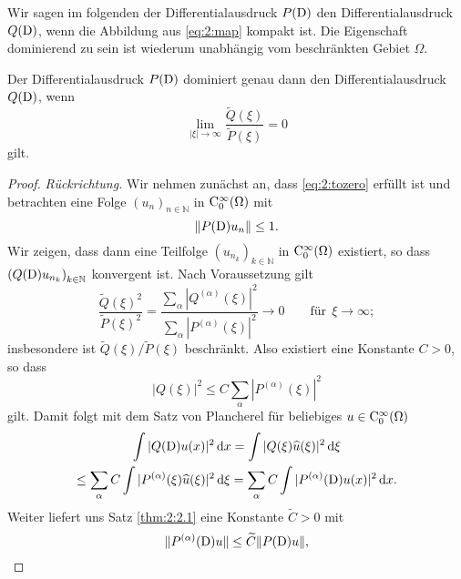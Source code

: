 Wir sagen im folgenden der Differentialausdruck $P(\mathrm D)$  den Differentialausdruck $Q(\mathrm D)$, wenn die Abbildung aus \eqref{eq:2:map} kompakt ist. Die Eigenschaft dominierend zu sein ist wiederum unabhängig vom beschränkten Gebiet $\Omega$.

\begin{thm}\label{thm:2:Abbildung kompakt}
Der Differentialausdruck $P(\mathrm D)$ dominiert genau dann den Differentialausdruck $Q(\mathrm D)$,
wenn
\begin{equation}\label{eq:2:tozero}
\lim_{|\xi|\to\infty} \frac{\widetilde{Q}(\xi)}{\widetilde{P}(\xi)} = 0
\end{equation}
gilt.
\end{thm}
\begin{proof} {\it Rückrichtung.}
Wir nehmen zunächst an, dass \eqref{eq:2:tozero} erfüllt ist und betrachten eine Folge ${(u_n)}_{n \in \mathbb{N}} $ in $\mathrm C^\infty_0(\Omega)$ mit
\begin{equation}\label{eq:2:PDb}
\lVert P(\mathrm D)u_n\rVert\leq 1.
\end{equation}
Wir zeigen, dass dann eine Teilfolge ${(u_{n_k})}_{k \in \mathbb{N}}$ in $\mathrm C^\infty_0(\Omega)$ existiert,
so dass  $\left(Q(\mathrm D)u_{n_k}\right)_{k \in \mathbb{N}}$ konvergent ist. Nach Voraussetzung gilt 
\begin{equation}
\frac{\widetilde{Q}(\xi)^2}{\widetilde{P}(\xi)^2} = \frac{\sum_{\alpha} | Q^{(\alpha)} (\xi)|^2  }{ \sum_{\alpha} | P^{(\alpha)} (\xi)|^2} \rightarrow 0\qquad  \text{für} \ \ \xi \rightarrow \infty;
\end{equation}
insbesondere ist $\widetilde Q(\xi)/\widetilde P(\xi)$ beschränkt. Also existiert eine Konstante $C>0$, so dass
\begin{equation}
|Q(\xi)|^2 \leq C \sum_{\alpha} | P^{(\alpha)} (\xi)|^2 \label{eq:1.5}
\end{equation}
gilt. Damit folgt mit dem Satz von Plancherel für beliebiges $u\in\mathrm C_0^\infty(\Omega)$
\begin{multline}
\int |Q(\mathrm D)u(x)|^2 \,\mathrm d x = \int |Q(\xi) \widehat{u}(\xi)|^2 \,\mathrm d \xi \\
\leq  \sum_{\alpha}C\int | P^{(\alpha)} (\xi) \widehat u(\xi)|^2 \,\mathrm d \xi =\sum_{\alpha} C\int |P^{(\alpha)}(\mathrm D)u(x)|^2 \,\mathrm d x.
\end{multline}
Weiter liefert uns  Satz \ref{thm:2:2.1} eine Konstante $\widetilde{C}>0$ mit
\begin{equation}
\Vert P^{(\alpha)}(\D)u \Vert \leq \widetilde{C} \Vert P(\D)u \Vert, \label{eq:ableitung leq PD}

\end{equation}
\end{proof}
